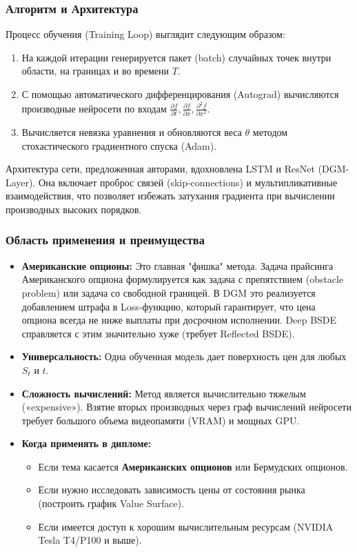 \documentclass[12pt, a4paper]{article}
\begin{document}
\subsubsection{Алгоритм и Архитектура}
Процесс обучения (Training Loop) выглядит следующим образом:
\begin{enumerate}
    \item На каждой итерации генерируется пакет (batch) случайных точек внутри области, на границах и во времени $T$.
    \item С помощью автоматического дифференцирования (Autograd) вычисляются производные нейросети по входам $\frac{\partial f}{\partial t}, \frac{\partial f}{\partial x}, \frac{\partial^2 f}{\partial x^2}$.
    \item Вычисляется невязка уравнения и обновляются веса $\theta$ методом стохастического градиентного спуска (Adam).
\end{enumerate}

Архитектура сети, предложенная авторами, вдохновлена LSTM и ResNet (DGM-Layer). Она включает проброс связей (skip-connections) и мультипликативные взаимодействия, что позволяет избежать затухания градиента при вычислении производных высоких порядков.

\subsubsection{Область применения и преимущества}
\begin{itemize}
    \item \textbf{Американские опционы:} Это главная "фишка" метода. Задача прайсинга Американского опциона формулируется как задача с препятствием (obstacle problem) или задача со свободной границей. В DGM это реализуется добавлением штрафа в Loss-функцию, который гарантирует, что цена опциона всегда не ниже выплаты при досрочном исполнении. Deep BSDE справляется с этим значительно хуже (требует Reflected BSDE).
    \item \textbf{Универсальность:} Одна обученная модель дает поверхность цен для любых $S_t$ и $t$.
    \item \textbf{Сложность вычислений:} Метод является вычислительно тяжелым («expensive»). Взятие вторых производных через граф вычислений нейросети требует большого объема видеопамяти (VRAM) и мощных GPU.
    \item \textbf{Когда применять в дипломе:}
    \begin{itemize}
        \item Если тема касается \textbf{Американских опционов} или Бермудских опционов.
        \item Если нужно исследовать зависимость цены от состояния рынка (построить график Value Surface).
        \item Если имеется доступ к хорошим вычислительным ресурсам (NVIDIA Tesla T4/P100 и выше).
    \end{itemize}
\end{itemize}
\end{document}
